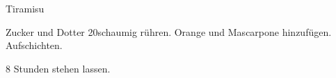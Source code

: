 \begin{recipe}[\vegetarian]{Tiramisu}

    \begin{ingredients}
    \end{ingredients}

    \begin{instructions}
        Zucker und Dotter 20\minutes schaumig rühren.
        Orange und Mascarpone hinzufügen.
        Aufschichten.

        8 Stunden stehen lassen.
    \end{instructions}
\end{recipe}
